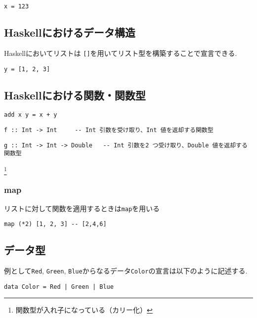 \begin{lstlisting}
x = 123
\end{lstlisting}
\subsection{Haskellにおけるデータ構造}
Haskellにおいてリストは \verb|[]|を用いてリスト型を構築することで宣言できる.
\begin{lstlisting}
y = [1, 2, 3]
\end{lstlisting}
\subsection{Haskellにおける関数・関数型}
\begin{lstlisting}
add x y = x + y
\end{lstlisting}

\begin{lstlisting}
f :: Int -> Int		-- Int 引数を受け取り、Int 値を返却する関数型
\end{lstlisting}
\begin{lstlisting}
g :: Int -> Int -> Double	-- Int 引数を2 つ受け取り、Double 値を返却する関数型
\end{lstlisting}
\footnote{関数型が入れ子になっている（カリー化）}
\subsubsection{map}
リストに対して関数を適用するときは\verb|map|を用いる
\begin{lstlisting}
map (*2) [1, 2, 3] -- [2,4,6]
\end{lstlisting}

\subsection{データ型}
例として\verb|Red|, \verb|Green|, \verb|Blue|からなるデータ\verb|Color|の宣言は以下のように記述する.
\begin{lstlisting}
data Color = Red | Green | Blue 
\end{lstlisting}

\begin{comment}
データを表示するためには, \verb|Color| を型クラス \verb|Show| のインスタンスにする必要があることに注意する.
\begin{lstlisting}
data Color = Red | Green | Blue deriving Show
\end{lstlisting}
\end{comment}

